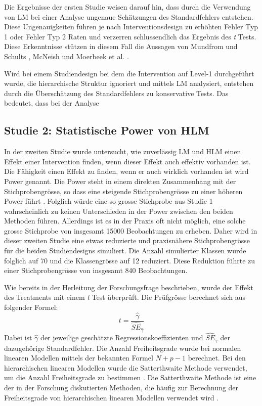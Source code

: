 \documentclass[12pt]{article}\usepackage[]{graphicx}\usepackage[]{color}
\begin{document}
Die Ergebnisse der ersten Studie weisen darauf hin, dass durch die Verwendung von LM bei einer Analyse ungenaue Schätzungen des Standardfehlers entstehen. Diese Ungenauigkeiten führen je nach Interventionsdesign zu erhöhten Fehler Typ 1 oder Fehler Typ 2 Raten und verzerren schlussendlich das Ergebnis des \textit{t} Tests. Diese Erkenntnisse stützen in diesem Fall die Aussagen von Mundfrom und Schults \citeyearpar{mundfrom2002monte}, McNeish \citeyearpar{mcneish2014analyzing} und Moerbeek et al. \citeyearpar{MOERBEEK2003341}.

Wird bei einem Studiendesign bei dem die Intervention auf Level-1 durchgeführt wurde, die hierarchische Struktur ignoriert und mittels LM analysiert, entstehen durch die Überschätzung des Standardfehlers zu konservative Tests. Das bedeutet, dass bei der Analyse 








\subsection{Studie 2: Statistische Power von HLM}
In der zweiten Studie wurde untersucht, wie zuverlässig LM und HLM einen Effekt einer Intervention finden, wenn dieser Effekt auch effektiv vorhanden ist. Die Fähigkeit einen Effekt zu finden, wenn er auch wirklich vorhanden ist wird Power genannt. Die Power steht in einem direkten Zusammenhang mit der Stichprobengrösse, so dass eine steigende Stichprobengrösse zu einer höheren Power führt \citep{snijders2005samplesizepower}. Folglich würde eine so grosse Stichprobe aus Studie 1 wahrscheinlich zu keinen Unterschieden in der Power zwischen den beiden Methoden führen. Allerdings ist es in der Praxis oft nicht möglich, eine solche grosse Stichprobe von insgesamt 15000 Beobachtungen zu erheben. Daher wird in dieser zweiten Studie eine etwas reduzierte und praxisnähere Stichprobengrösse für die beiden Studiendesigns simuliert. Die Anzahl simulierter Klassen wurde folglich auf 70 und die Klassengrösse auf 12 reduziert. Diese Reduktion führte zu einer Stichprobengrösse von insgesamt 840 Beobachtungen. 

Wie bereits in der Herleitung der Forschungsfrage beschrieben, wurde der Effekt des Treatments mit einem \textit{t} Test überprüft. Die Prüfgrösse berechnet sich aus folgender Formel:
\begin{equation}
t = \dfrac{\widehat{\gamma}}{\widehat{SE}_{\widehat{\gamma}}}
\end{equation}
Dabei ist $\widehat{\gamma}$ der jeweilige geschätzte Regressionskoeffizienten und $\widehat{SE}_{\widehat{\gamma}}$ der dazugehörige Standardfehler. Die Anzahl Freiheitsgrade wurde bei normalen linearen Modellen mittels der bekannten Formel $N + p - 1$ berechnet. Bei den hierarchischen linearen Modellen wurde die Satterthwaite Methode verwendet, um die Anzahl Freiheitsgrade zu bestimmen \citeyearpar{satter1941synthesis}. Die Satterthwaite Methode ist eine der in der Forschung diskutierten Methoden, die häufig zur Berechnung der Freiheitsgrade von hierarchischen linearen Modellen verwendet wird \citep{raudenbush2002hierarchical,SnijdersTomA.B2012Ma:a}. 
\end{document}
